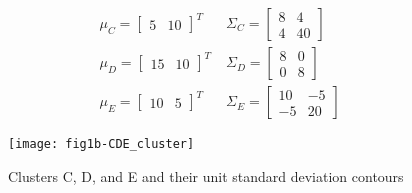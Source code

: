  \begin{eqnarray}
{\mu}_{C}=\left[ \begin{smallmatrix} 5&10 \end{smallmatrix}\right]^{T} \; & {\Sigma}_{C}=\left[ \begin{smallmatrix} 8&4 \\ 4&40 \end{smallmatrix}\right] \nonumber\\
{\mu}_{D}=\left[ \begin{smallmatrix} 15&10 \end{smallmatrix}\right]^{T} \; & {\Sigma}_{D}=\left[ \begin{smallmatrix} 8&0 \\ 0&8 \end{smallmatrix}\right] \nonumber\\
{\mu}_{E}=\left[ \begin{smallmatrix} 10&5 \end{smallmatrix}\right]^{T} \; & {\Sigma}_{E}=\left[ \begin{smallmatrix} 10&-5 \\ -5&20 \end{smallmatrix}\right] \nonumber
\end{eqnarray}
 
 
\begin{figure}[ht]
\centering
	\texttt{[image: fig1b-CDE\_cluster]}
	\label{fig:clustersDataCDE}
	\caption{Clusters C, D, and E and their unit standard deviation contours}
\end{figure}
 
\clearpage
